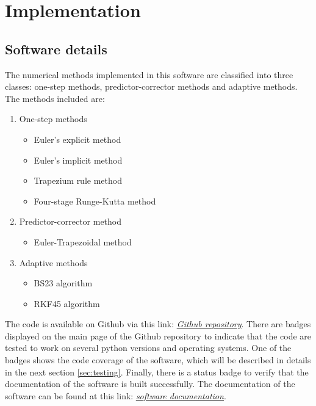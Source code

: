 \chapter{Implementation}
\label{chap:code-implementation}
\section{Software details}
\label{sec:software-details}
The numerical methods implemented in this software are classified into three classes: one-step methods, predictor-corrector methods and adaptive methods. The methods included are:
\begin{enumerate}
    \item One-step methods
    \begin{itemize}
        \item Euler's explicit method
        \item Euler's implicit method
        \item Trapezium rule method
        \item Four-stage Runge-Kutta method
    \end{itemize}
    \item Predictor-corrector method
    \begin{itemize}
        \item Euler-Trapezoidal method
    \end{itemize}
    \item Adaptive methods
    \begin{itemize}
        \item BS23 algorithm
        \item RKF45 algorithm
    \end{itemize}
\end{enumerate}
The code is available on Github via this link: \href{https://github.com/FarmHJ/numerical-solver}{\underline{\emph{Github repository}}}. There are badges displayed on the main page of the Github repository to indicate that the code are tested to work on several python versions and operating systems. One of the badges shows the code coverage of the software, which will be described in details in the next section \ref{sec:testing}. Finally, there is a status badge to verify that the documentation of the software is built successfully. The documentation of the software can be found at this link: \href{https://numerical-solver.readthedocs.io/en/latest/index.html}{\underline{\emph{software documentation}}}.

